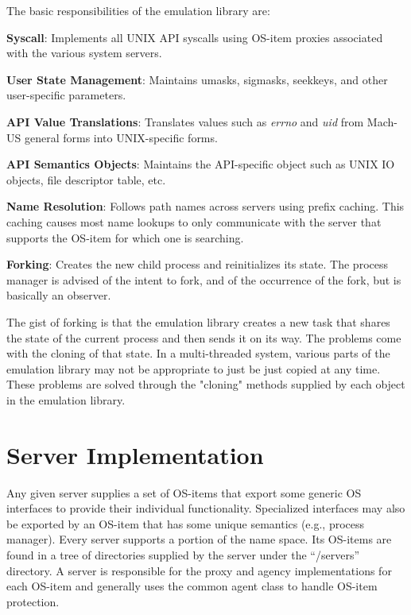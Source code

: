 The basic responsibilities of the emulation library are:
\begin{description}
\item{\bf Syscall}:  Implements all UNIX API syscalls using OS-item
proxies associated with the various system servers.

\item{\bf User State Management}: Maintains umasks, sigmasks, seekkeys,
and other user-specific parameters.

\item{\bf API Value Translations}:  Translates values such as 
{\em errno} and {\em uid}
from Mach-US general forms into UNIX-specific forms.

\item{\bf API Semantics Objects}:  Maintains the API-specific object such
as UNIX IO objects, file descriptor table, etc.

\item{\bf Name Resolution}: Follows path names across servers
using prefix caching.  This caching causes most name lookups to only
communicate with the server that supports the OS-item for which
one is searching.

\item{\bf Forking}:  
Creates the new child process and reinitializes its state.
The process manager is advised of the intent to
fork, and of the occurrence of the fork, but is basically an observer.

The gist of forking is that the emulation library creates a new task
that shares the state of the current process and then sends it on its way.
The problems come with the cloning of that state.  In a multi-threaded
system, various parts of the emulation library may not be appropriate
to just be just copied at any time.  These problems are solved through
the "cloning" methods supplied by each object in the emulation library.
\end{description}

\section{Server Implementation}
Any given server supplies a set of OS-items that export some generic
OS interfaces to provide their individual functionality.  Specialized
interfaces may also be exported by an OS-item that has some
unique semantics (e.g., process manager).  Every server supports a
portion of the name 
space.  Its OS-items are found in a tree of directories supplied by the
server under the ``/servers'' directory.  A server is responsible for the proxy
and agency implementations for each OS-item and generally
uses the common agent class to handle OS-item protection.

